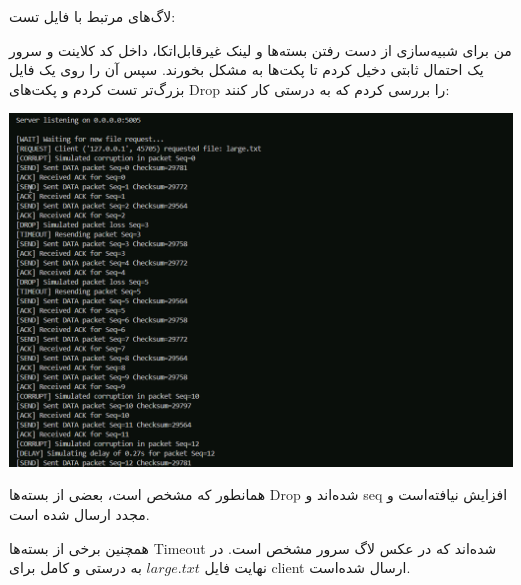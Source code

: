 لاگ‌های مرتبط با فایل تست:


		{}



من برای شبیه‌سازی از دست رفتن بسته‌ها و لینک غیرقابل‌اتکا، داخل کد کلاینت و سرور یک احتمال ثابتی دخیل کردم تا پکت‌ها به مشکل بخورند. سپس آن را روی یک فایل بزرگ‌‌‌تر تست کردم و پکت‌‌های Drop را بررسی کردم که به درستی کار کنند:


{\centering 

{
\includegraphics[width=0.7\linewidth]{screenshot001}

}}

همانطور که مشخص است، بعضی از بسته‌ها Drop شده‌اند و seq افزایش نیافته‌است و مجدد ارسال شده است.

همچنین برخی از بسته‌ها Timeout شده‌اند که در عکس لاگ سرور مشخص است. 
در نهایت فایل $large.txt$ به درستی و کامل برای client ارسال شده‌است.

